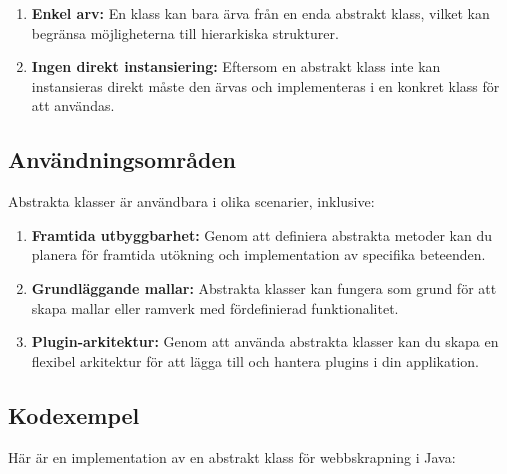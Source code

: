 \begin{enumerate}
\def\labelenumi{\arabic{enumi}.}
\tightlist
\item
  \textbf{Enkel arv:} En klass kan bara ärva från en enda abstrakt
  klass, vilket kan begränsa möjligheterna till hierarkiska strukturer.
\item
  \textbf{Ingen direkt instansiering:} Eftersom en abstrakt klass inte
  kan instansieras direkt måste den ärvas och implementeras i en konkret
  klass för att användas.
\end{enumerate}

\hypertarget{anvuxe4ndningsomruxe5den}{%
\subsection{Användningsområden}\label{anvuxe4ndningsomruxe5den}}

Abstrakta klasser är användbara i olika scenarier, inklusive:

\begin{enumerate}
\def\labelenumi{\arabic{enumi}.}
\tightlist
\item
  \textbf{Framtida utbyggbarhet:} Genom att definiera abstrakta metoder
  kan du planera för framtida utökning och implementation av specifika
  beteenden.
\item
  \textbf{Grundläggande mallar:} Abstrakta klasser kan fungera som grund
  för att skapa mallar eller ramverk med fördefinierad funktionalitet.
\item
  \textbf{Plugin-arkitektur:} Genom att använda abstrakta klasser kan du
  skapa en flexibel arkitektur för att lägga till och hantera plugins i
  din applikation.
\end{enumerate}

\hypertarget{kodexempel}{%
\subsection{Kodexempel}\label{kodexempel}}

Här är en implementation av en abstrakt klass för webbskrapning i Java:

